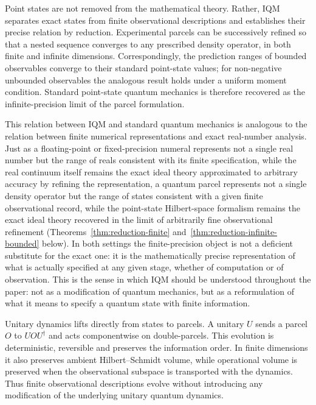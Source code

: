 \documentclass[11pt, onecolumn]{article}
\begin{document}
Point states are not removed from the mathematical theory. Rather, IQM
separates exact states from finite observational descriptions and establishes
their precise relation by reduction. Experimental parcels can be successively
refined so that a nested sequence converges to any prescribed density
operator, in both finite and infinite dimensions. Correspondingly, the
prediction ranges of bounded observables converge to their standard
point-state values; for non-negative unbounded observables the analogous
result holds under a uniform moment condition. Standard point-state quantum
mechanics is therefore recovered as the infinite-precision limit of the
parcel formulation.

This relation between IQM and standard quantum mechanics is analogous to the
relation between finite numerical representations and exact real-number
analysis. Just as a floating-point or fixed-precision numeral represents not
a single real number but the range of reals consistent with its finite
specification, while the real continuum itself remains the exact ideal
theory approximated to arbitrary accuracy by refining the representation, a
quantum parcel represents not a single density operator but the range of
states consistent with a given finite observational record, while the
point-state Hilbert-space formalism remains the exact ideal theory recovered
in the limit of arbitrarily fine observational refinement
(Theorems~\ref{thm:reduction-finite} and~\ref{thm:reduction-infinite-bounded}
below). In both settings the finite-precision object is not a deficient
substitute for the exact one: it is the mathematically precise
representation of what is actually specified at any given stage, whether of
computation or of observation. This is the sense in which IQM should be
understood throughout the paper: not as a modification of quantum mechanics,
but as a reformulation of what it means to specify a quantum state with
finite information.

Unitary dynamics lifts directly from states to parcels. A unitary $U$ sends
a parcel $O$ to $UOU^\dagger$ and acts componentwise on double-parcels.
This evolution is deterministic, reversible and preserves the information
order. In finite dimensions it also preserves ambient Hilbert--Schmidt
volume, while operational volume is preserved when the observational
subspace is transported with the dynamics. Thus finite observational
descriptions evolve without introducing any modification of the underlying
unitary quantum dynamics.
\end{document}
